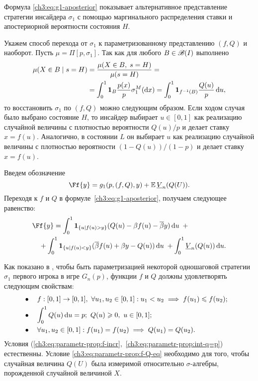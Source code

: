 {Формула \eqref{ch3:eq:g1-aposterior} показывает альтернативное представление стратегии инсайдера $\sigma_1$ с помощью маргинального распределения ставки и апостериорной вероятности состояния $H$.

Укажем способ перехода от $\sigma_1$ к параметризованному представлению $(f, Q)$ и наоборот.
Пусть $\mu = \Pi[p, \sigma_1]$.
Так как для любого $B \in \mathscr{B}(I)$ выполнено
\begin{align*}
  \mu(X \in B \; | \; s = H) 
  &= \frac{\mu(X \in B, \; s = H)}{\mu(s = H)} = \\
  &= \int_0^1 \mathbf{1}_{B} \frac{p(x)}{p} \sigma^M_1(\mathop{}\!\mathrm{d} x) =
  \int_0^1 \mathbf{1}_{f^{-1}(B)} \frac{Q(u)}{p} \mathop{}\!\mathrm{d} u,
\end{align*}
то восстановить $\sigma_1$ по $(f, Q)$ можно следующим образом.
Если ходом случая было выбрано состояние $H$, то инсайдер выбирает $u \in [0, 1]$ как реализацию случайной величины с плотностью вероятности $Q(u)/p$ и делает ставку $x = f(u)$.
Аналогично, в состоянии $L$ он выбирает $u$ как реализацию случайной величины с плотностью вероятности $(1 - Q(u))/(1 - p)$ и делает ставку $x = f(u)$.

Введем обозначение
\[
  \Ff{y} = g_1(p, (f, Q), y) + \E \LV{n}(Q(U)).
\]
Переходя к $f$ и $Q$ в формуле~\eqref{ch3:eq:g1-aposterior}, получаем следующее равенство:
\begin{equation}\label{ch3:eq:F(f,Q,p)}
\begin{multlined}
  \Ff{y} =
  \int_0^1 \Ind{\{u | f(u) > y\}} (Q(u) - \Co f(u) - \DCo y) \di u \enskip + \\
  + \int_0^1 \Ind{\{u | f(u) < y\}} (\DCo f(u) + \Co y - Q(u)) \di u \; + \int_0^1
  \LV{n}(Q(u)) \di u.
\end{multlined}
\end{equation}

Как показано в \cite{demeyer02}, чтобы быть параметризацией некоторой одношаговой стратегии $\sigma_1$ первого игрока в игре $G_n(p)$, функции $f$ и $Q$ должны удовлетворять следующим свойствам:
\begin{subequations}
  \begin{flalign}
    \label{ch3:eq:parametr-prop:f-incr}
    &\bullet\quad f: [0, 1] \rightarrow [0, 1],\ \forall u_1, u_2 \in [0, 1]: u_1 < u_2 \implies f(u_1) \leqslant f(u_2); &\\
    \label{ch3:eq:parametr-prop:int-q=p}
    &\bullet\quad \int_0^1 Q(u) \mathop{}\!\mathrm{d} u = p;\ Q(u) \geqslant 0,\ u \in [0, 1];&\\
    \label{ch3:eq:parametr-prop:f-Q-eq}
    &\bullet\quad \forall u_1, u_2 \in [0, 1]: f(u_1) = f(u_2) \implies Q(u_1) = Q(u_2).&
  \end{flalign}
\end{subequations}
Условия (\ref{ch3:eq:parametr-prop:f-incr},~\ref{ch3:eq:parametr-prop:int-q=p}) естественны.
Условие \eqref{ch3:eq:parametr-prop:f-Q-eq} необходимо для того, чтобы случайная величина $Q(U)$ была измеримой относительно $\sigma$-алгебры, порожденной случайной величиной $X$.

}
